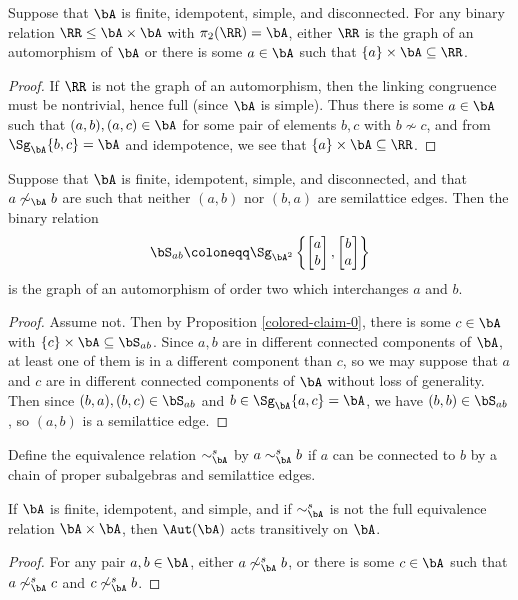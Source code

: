 \begin{prop}\label{colored-claim-0} Suppose that $\bA$ is finite, idempotent, simple, and disconnected. For any binary relation $\RR \le \bA \times \bA$ with $\pi_2(\RR) = \bA$, either $\RR$ is the graph of an automorphism of $\bA$ or there is some $a \in \bA$ such that $\{a\} \times \bA \subseteq \RR$.
\end{prop}
\begin{proof} If $\RR$ is not the graph of an automorphism, then the linking congruence must be nontrivial, hence full (since $\bA$ is simple). Thus there is some $a \in \bA$ such that $(a,b),(a,c) \in \bA$ for some pair of elements $b,c$ with $b \not\sim c$, and from $\Sg_{\bA}\{b,c\} = \bA$ and idempotence, we see that $\{a\}\times \bA \subseteq \RR$.
\end{proof}

\begin{prop}\label{colored-claim-1} Suppose that $\bA$ is finite, idempotent, simple, and disconnected, and that $a \not\sim_\bA b$ are such that neither $(a,b)$ nor $(b,a)$ are semilattice edges. Then the binary relation
\[
\bS_{ab} \coloneqq \Sg_{\bA^2}\left\{\begin{bmatrix} a\\ b\end{bmatrix}, \begin{bmatrix} b\\ a\end{bmatrix}\right\}
\]
is the graph of an automorphism of order two which interchanges $a$ and $b$.
\end{prop}
\begin{proof} Assume not. Then by Proposition \ref{colored-claim-0}, there is some $c \in \bA$ with $\{c\}\times \bA \subseteq \bS_{ab}$. Since $a,b$ are in different connected components of $\bA$, at least one of them is in a different component than $c$, so we may suppose that $a$ and $c$ are in different connected components of $\bA$ without loss of generality. Then since $(b,a), (b,c) \in \bS_{ab}$ and $b \in \Sg_{\bA}\{a,c\} = \bA$, we have $(b,b) \in \bS_{ab}$, so $(a,b)$ is a semilattice edge.
\end{proof}

\begin{defn} Define the equivalence relation $\sim^s_\bA$ by $a \sim^s_\bA b$ if $a$ can be connected to $b$ by a chain of proper subalgebras and semilattice edges.
\end{defn}

\begin{cor}\label{colored-claim-1-cor} If $\bA$ is finite, idempotent, and simple, and if $\sim^s_\bA$ is not the full equivalence relation $\bA \times \bA$, then $\Aut(\bA)$ acts transitively on $\bA$.
\end{cor}
\begin{proof} For any pair $a,b \in \bA$, either $a \not\sim^s_\bA b$, or there is some $c \in \bA$ such that $a \not\sim^s_\bA c$ and $c \not\sim^s_\bA b$.
\end{proof}

